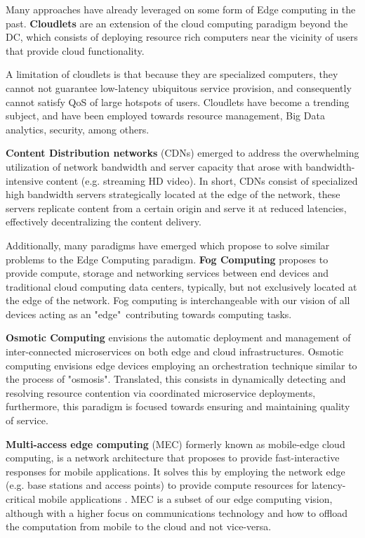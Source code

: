 Many approaches have already leveraged on some form of Edge computing in the past. \textbf{Cloudlets} \cite{10.1145/2307849.2307858} are an extension of the cloud computing paradigm beyond the DC, which consists of deploying resource rich computers near the vicinity of users that provide cloud functionality.

A limitation of cloudlets is that because they are specialized computers, they cannot not guarantee low-latency ubiquitous service provision, and consequently cannot satisfy QoS of large hotspots of users. Cloudlets have become a trending subject, and have been employed towards resource management, Big Data analytics, security, among others.

\textbf{Content Distribution networks} \cite{peng2004cdn} (CDNs) emerged to address the overwhelming utilization of network bandwidth and server capacity that arose with bandwidth-intensive content (e.g. streaming HD video). In short, CDNs consist of specialized high bandwidth servers strategically located at the edge of the network, these servers replicate content from a certain origin and serve it at reduced latencies, effectively decentralizing the content delivery. 

Additionally, many paradigms have emerged which propose to solve similar problems to the Edge Computing paradigm. \textbf{Fog Computing} \cite{bonomi2012fog} proposes to provide compute, storage and networking services between end devices and traditional cloud computing data centers, typically, but not exclusively located at the edge of the network. Fog computing is interchangeable with our vision of all devices acting as an "edge"\ contributing towards computing tasks.

\textbf{Osmotic Computing} \cite{villari2016osmotic} envisions the automatic deployment and management of inter-connected microservices on both edge and cloud infrastructures. Osmotic computing envisions edge devices employing an orchestration technique similar to the process of "osmosis". Translated, this consists in dynamically detecting and resolving resource contention via coordinated microservice deployments, furthermore, this paradigm is focused towards ensuring and maintaining quality of service.

\textbf{Multi-access edge computing} (MEC) formerly known as mobile-edge cloud computing, is a network architecture that proposes to provide fast-interactive responses for mobile applications. It solves this by employing the network edge (e.g. base stations and access points) to provide compute resources for latency-critical mobile applications \cite{mobile_edge_cloud}. MEC is a subset of our edge computing vision, although with a higher focus on communications technology and how to offload the computation from mobile to the cloud and not vice-versa. 


